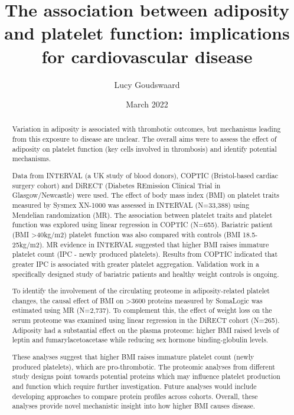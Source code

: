 \documentclass[11pt,twoside]{bristolthesis}
\title{The association between adiposity and platelet function: implications for cardiovascular disease}
\author{Lucy Goudswaard}
\date{March 2022}
\begin{document}
  \maketitle



\frontmatter %
\pagestyle{empty} %
  \begin{abstract}
    Variation in adiposity is associated with thrombotic outcomes, but mechanisms leading from this exposure to disease are unclear. The overall aims were to assess the effect of adiposity on platelet function (key cells involved in thrombosis) and identify potential mechanisms.

    Data from INTERVAL (a UK study of blood donors), COPTIC (Bristol-based cardiac surgery cohort) and DiRECT (Diabetes REmission Clinical Trial in Glasgow/Newcastle) were used. The effect of body mass index (BMI) on platelet traits measured by Sysmex XN-1000 was assessed in INTERVAL (N=33,388) using Mendelian randomization (MR). The association between platelet traits and platelet function was explored using linear regression in COPTIC (N=655). Bariatric patient (BMI \textgreater40kg/m2) platelet function was also compared with controls (BMI 18.5-25kg/m2). MR evidence in INTERVAL suggested that higher BMI raises immature platelet count (IPC - newly produced platelets). Results from COPTIC indicated that greater IPC is associated with greater platelet aggregation. Validation work in a specifically designed study of bariatric patients and healthy weight controls is ongoing.

    To identify the involvement of the circulating proteome in adiposity-related platelet changes, the causal effect of BMI on \textgreater3600 proteins measured by SomaLogic was estimated using MR (N=2,737). To complement this, the effect of weight loss on the serum proteome was examined using linear regression in the DiRECT cohort (N=265). Adiposity had a substantial effect on the plasma proteome: higher BMI raised levels of leptin and fumarylacetoacetase while reducing sex hormone binding-globulin levels.

    These analyses suggest that higher BMI raises immature platelet count (newly produced platelets), which are pro-thrombotic. The proteomic analyses from different study designs point towards potential proteins which may influence platelet production and function which require further investigation. Future analyses would include developing approaches to compare protein profiles across cohorts. Overall, these analyses provide novel mechanistic insight into how higher BMI causes disease.
  \end{abstract}
\end{document}
